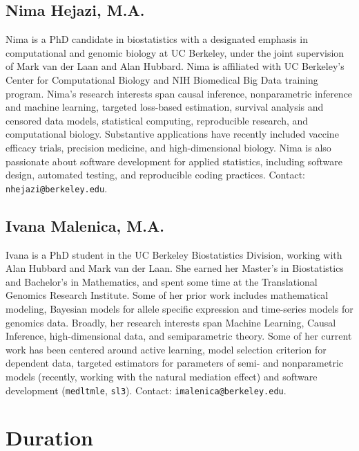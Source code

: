 \documentclass[a4paper,11pt]{texMemo}
\begin{document}
\subsection{Nima Hejazi, M.A.}

Nima is a PhD candidate in biostatistics with a designated emphasis in
computational and genomic biology at UC Berkeley, under the joint supervision of
Mark van der Laan and Alan Hubbard. Nima is affiliated with UC Berkeley's Center
for Computational Biology and NIH Biomedical Big Data training program. Nima's
research interests span causal inference, nonparametric inference and machine
learning, targeted loss-based estimation, survival analysis and censored
data models, statistical computing, reproducible research, and computational
biology. Substantive applications have recently included vaccine efficacy
trials, precision medicine, and high-dimensional biology. Nima is also
passionate about software development for applied statistics, including software
design, automated testing, and reproducible coding practices. Contact:
\texttt{nhejazi@berkeley.edu}.

\subsection{Ivana Malenica, M.A.}

Ivana is a PhD student in the UC Berkeley Biostatistics Division, working
with Alan Hubbard and Mark van der Laan. She earned her Master's in
Biostatistics and Bachelor's in Mathematics, and spent some time at the
Translational Genomics Research Institute. Some of her prior work includes
mathematical modeling, Bayesian models for allele specific expression and
time-series models for genomics data. Broadly, her research interests span
Machine Learning, Causal Inference, high-dimensional data, and semiparametric
theory. Some of her current work has been centered around active learning, model
selection criterion for dependent data, targeted estimators for parameters of
semi- and nonparametric models (recently, working with the natural mediation
effect) and software development (\texttt{medltmle}, \texttt{sl3}). Contact:
\texttt{imalenica@berkeley.edu}.

\section{Duration}
\end{document}
